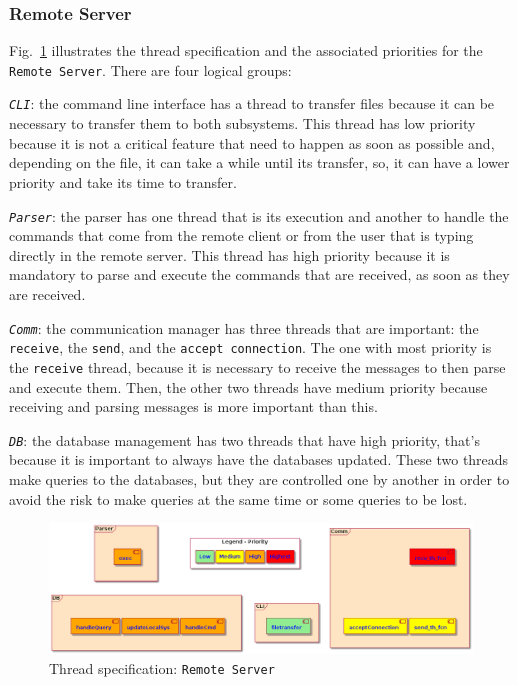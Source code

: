 \subsubsection{Remote Server}
\label{sec:remote-server-threads}

Fig.~\ref{fig:thread-spec-rs} illustrates the thread specification and the associated priorities for the \texttt{Remote Server}. 
There are four logical groups:
\begin{enum-c}
\item\emph{\texttt{CLI}}: the command line interface has a thread to transfer files because it can be necessary to transfer them to both subsystems.
This thread has low priority because it is not a critical feature that need to happen as soon as possible and, depending on the file, it can take a while until its transfer, so, it can have a lower priority and take its time to transfer.
\item\emph{\texttt{Parser}}: the parser has one thread that is its execution and another to handle the commands that come from the remote client or from the user that is typing directly in the remote server. This thread has high priority because it is mandatory to parse and execute the commands that are received, as soon as they are received.
\item\emph{\texttt{Comm}}: the communication manager has three threads that are important: the \texttt{receive}, the \texttt{send}, and the \texttt{accept connection}. The one with most priority is the \texttt{receive} thread, because it is necessary to receive the messages to then parse and execute them. Then, the other two threads have medium priority because receiving and parsing messages is more important than this.
\item\emph{\texttt{DB}}: the database management has two threads that have high priority, that's because it is important to always have the databases updated. These two threads make queries to the databases, but they are controlled one by another in order to avoid the risk to make queries at the same time or some queries to be lost.
\end{enum-c}
%
\begin{figure}[htb!]
\centering
    \includegraphics[width=0.8\columnwidth]{./img/thread-spec-rs.png}
  \caption{Thread specification: \texttt{Remote Server}}%
\label{fig:thread-spec-rs}
\end{figure}
%

